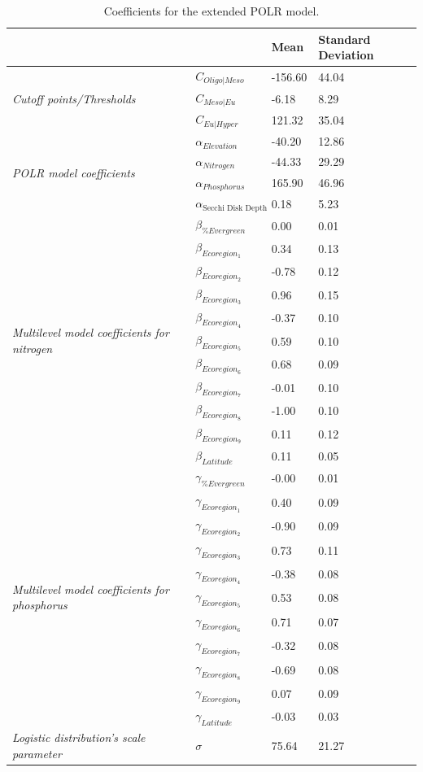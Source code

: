 \documentclass[fleqn,10pt]{wlpeerj} %
\begin{document}


\pagebreak
\begin{table}[ht]
\caption {Coefficients for the extended POLR model.}
\label{tab:MultiPOLRCoeff}
\centering
 \begin{tabular}{llll}
  \hline
  &  & Mean & Standard Deviation\\ 
  \hline
  \multirow{3}{*}{\emph{Cutoff points/Thresholds}} & $C_{Oligo|Meso}$  & -156.60 & 44.04\\ 
  & $C_{Meso|Eu}$  & -6.18 & 8.29\\ 
  & $C_{Eu|Hyper}$ & 121.32 & 35.04\\ 
  \multirow{4}{*}{\emph{POLR model coefficients}}& $\alpha_{Elevation}$ & -40.20 & 12.86\\ 
  & $\alpha_{Nitrogen}$ & -44.33 & 29.29\\ 
  & $\alpha_{Phosphorus}$ & 165.90 & 46.96\\ 
  & $\alpha_{\text{Secchi Disk Depth}}$ & 0.18 & 5.23\\ 
  \multirow{11}{*}{\emph{Multilevel model coefficients for nitrogen}}& $\beta_{\%Evergreen}$ & 0.00 & 0.01\\ 
  & $\beta_{Ecoregion_1}$ & 0.34 & 0.13\\ 
  & $\beta_{Ecoregion_2}$ & -0.78 & 0.12\\ 
  & $\beta_{Ecoregion_3}$ & 0.96 & 0.15\\ 
  & $\beta_{Ecoregion_4}$ & -0.37 & 0.10\\ 
  & $\beta_{Ecoregion_5}$ & 0.59 & 0.10\\ 
  & $\beta_{Ecoregion_6}$ & 0.68 & 0.09\\ 
  & $\beta_{Ecoregion_7}$ & -0.01 & 0.10\\ 
  & $\beta_{Ecoregion_8}$ & -1.00 & 0.10\\ 
  & $\beta_{Ecoregion_9}$ & 0.11 & 0.12\\ 
  & $\beta_{Latitude}$ & 0.11 & 0.05\\ 
  \multirow{11}{*}{\emph{Multilevel model coefficients for phosphorus}}& $\gamma_{\%Evergreen}$ & -0.00 & 0.01\\ 
  & $\gamma_{Ecoregion_1}$ & 0.40 & 0.09\\ 
  & $\gamma_{Ecoregion_2}$ & -0.90 & 0.09\\ 
  & $\gamma_{Ecoregion_3}$ & 0.73 & 0.11\\ 
  & $\gamma_{Ecoregion_4}$ & -0.38 & 0.08\\ 
  & $\gamma_{Ecoregion_5}$ & 0.53 & 0.08\\ 
  & $\gamma_{Ecoregion_6}$ & 0.71 & 0.07\\ 
  & $\gamma_{Ecoregion_7}$ & -0.32 & 0.08\\ 
  & $\gamma_{Ecoregion_8}$ & -0.69 & 0.08\\ 
  & $\gamma_{Ecoregion_9}$ & 0.07 & 0.09\\ 
  & $\gamma_{Latitude}$ & -0.03 & 0.03\\ 
 {\emph{Logistic distribution's scale parameter}}& $\sigma$ & 75.64 & 21.27\\ 
  \hline
\end{tabular}
\end{table}
\end{document}
